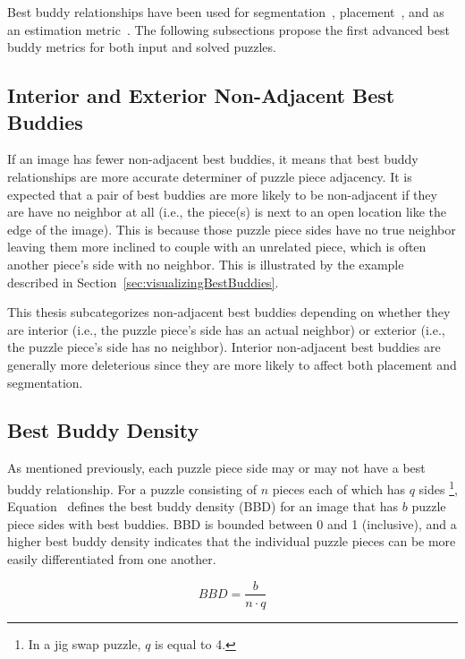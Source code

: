 Best buddy relationships have been used for segmentation~\cite{pomeranz2011}, placement~\cite{paikin2015}, and as an estimation metric~\cite{sholomon2013}.  The following subsections propose the first advanced best buddy metrics for both input and solved puzzles.

\subsection{Interior and Exterior Non-Adjacent Best Buddies}\label{sec:bestBuddyInteriorExterior}

If an image has fewer non-adjacent best buddies, it means that best buddy relationships are more accurate determiner of puzzle piece adjacency.  It is expected that a pair of best buddies are more likely to be non-adjacent if they are have no neighbor at all (i.e., the piece(s) is next to an open location like the edge of the image).  This is because those puzzle piece sides have no true neighbor leaving them more inclined to couple with an unrelated piece, which is often another piece's side with no neighbor.  This is illustrated by the example described in Section~\ref{sec:visualizingBestBuddies}.

This thesis subcategorizes non-adjacent best buddies depending on whether they are interior (i.e., the puzzle piece's side has an actual neighbor) or exterior (i.e., the puzzle piece's side has no neighbor).  Interior non-adjacent best buddies are generally more deleterious since they are more likely to affect both placement and segmentation. 

\subsection{Best Buddy Density}\label{sec:bestBuddyDensity}

As mentioned previously, each puzzle piece side may or may not have a best buddy relationship. For a puzzle consisting of $n$ pieces each of which has $q$ sides \footnote{In a jig swap puzzle, $q$ is equal to 4.}, Equation~ defines the best buddy density (BBD) for an image that has $b$ puzzle piece sides with best buddies.   BBD is bounded between 0 and 1 (inclusive), and a higher best buddy density indicates that the individual puzzle pieces can be more easily differentiated from one another.  

\begin{equation} \label{eq:bestBuddyDensity}
BBD = \frac{b}{n \cdot q}
\end{equation}

